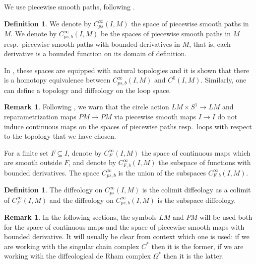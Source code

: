 \documentclass{scrartcl}
\theoremstyle{plain}
\theoremstyle{definition}
\newtheorem{definition}[theorem]{Definition}
\newtheorem{remark}[theorem]{Remark}
\renewcommand{\subset}{\subseteq}
\begin{document}
We use piecewise smooth paths, following \cite{stacey2017smooth}. 
\begin{definition}
    We denote by $C^\infty_{ps}(I, M)$ the space of piecewise smooth paths in $M$. We denote by $C^\infty_{ps, b}(I, M)$ be the spaces of piecewise smooth paths in $M$ resp.~piecewise smooth paths with bounded derivatives in $M$, that is, each derivative is a bounded function on its domain of definition.
\end{definition}
In \cite{stacey2017smooth}, these spaces are equipped with natural topologies and it is shown that there is a homotopy equivalence between $C^\infty_{ps, b}(I, M)$ and $C^0(I, M)$. Similarly, one can define a topology and diffeology on the loop space.
\begin{remark}
    Following \cite{stacey2017smooth}, we warn that the circle action $LM\times S^1\to LM$ and reparametrization maps $PM\to PM$ via piecewise smooth maps $I\to I$ do not induce continuous maps on the spaces of piecewise paths resp.~loops with respect to the topology that we have chosen. 
\end{remark}


For a finite set $F\subset I$, denote by $C^\infty_F(I, M)$ the space of continuous maps which are smooth outside $F$, and denote by $C^\infty_{F, b}(I, M)$ the subspace of functions with bounded derivatives. The space $C^\infty_{ps, b}$ is the union of the subspaces $C^\infty_{F, b}(I, M)$.
\begin{definition}
    The diffeology on $C^\infty_{ps}(I, M)$ is the colimit diffeology as a colimit of $C^\infty_{F}(I, M)$ and the diffeology on $C^\infty_{ps, b}(I, M)$ is the subspace diffeology. 
\end{definition}

\begin{remark}
    In the following sections, the symbols $LM$ and $PM$ will be used both for the space of continuous maps and the space of piecewise smooth maps with bounded derivative. It will usually be clear from context which one is used: if we are working with the singular chain complex $C^*$ then it is the former, if we are working with the diffeological de Rham complex $\Omega^*$ then it is the latter. 
\end{remark}
\end{document}
